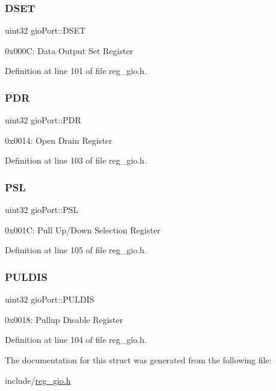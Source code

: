 \subsubsection{\texorpdfstring{D\+S\+ET}{DSET}}
{\footnotesize\ttfamily uint32 gio\+Port\+::\+D\+S\+ET}

0x000C\+: Data Output Set Register 

Definition at line 101 of file reg\+\_\+gio.\+h.

\mbox{\label{structgioPort_ab00723758dea485f173b09a6a50efbaa}} 
\subsubsection{\texorpdfstring{P\+DR}{PDR}}
{\footnotesize\ttfamily uint32 gio\+Port\+::\+P\+DR}

0x0014\+: Open Drain Register 

Definition at line 103 of file reg\+\_\+gio.\+h.

\mbox{\label{structgioPort_a4372c64b0ca6aed9e2908f6195cb6581}} 
\subsubsection{\texorpdfstring{P\+SL}{PSL}}
{\footnotesize\ttfamily uint32 gio\+Port\+::\+P\+SL}

0x001C\+: Pull Up/\+Down Selection Register 

Definition at line 105 of file reg\+\_\+gio.\+h.

\mbox{\label{structgioPort_a71985cf7f14f11f0a4dff3dc91eee3e7}} 
\subsubsection{\texorpdfstring{P\+U\+L\+D\+IS}{PULDIS}}
{\footnotesize\ttfamily uint32 gio\+Port\+::\+P\+U\+L\+D\+IS}

0x0018\+: Pullup Disable Register 

Definition at line 104 of file reg\+\_\+gio.\+h.



The documentation for this struct was generated from the following file\+:\begin{DoxyCompactItemize}
\item 
include/\mbox{\hyperlink{reg__gio_8h}{reg\+\_\+gio.\+h}}\end{DoxyCompactItemize}
